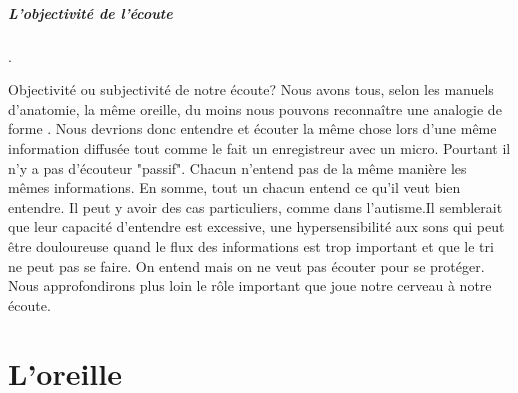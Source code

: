 \subparagraph{L'objectivité de l'écoute}.

Objectivité ou subjectivité de notre écoute?  Nous avons tous,
selon les manuels d'anatomie, la même
oreille, du moins nous pouvons reconnaître une analogie de forme . Nous devrions donc entendre et écouter la même chose
lors d'une même information diffusée tout comme le fait un enregistreur avec un micro. Pourtant il n'y a pas d'écouteur "passif". Chacun n'entend pas de la même manière les mêmes
informations. En somme, tout un chacun entend ce qu'il veut bien
entendre. 
Il peut y avoir des cas particuliers, comme dans l'autisme.Il semblerait que leur capacité d'entendre est excessive, une hypersensibilité aux sons qui peut être douloureuse quand  le flux des informations est trop important et que le tri ne peut pas se faire. On entend mais on ne veut pas écouter pour se protéger.
Nous approfondirons plus loin le rôle important que joue notre cerveau à notre
écoute.
\section{L'oreille}
